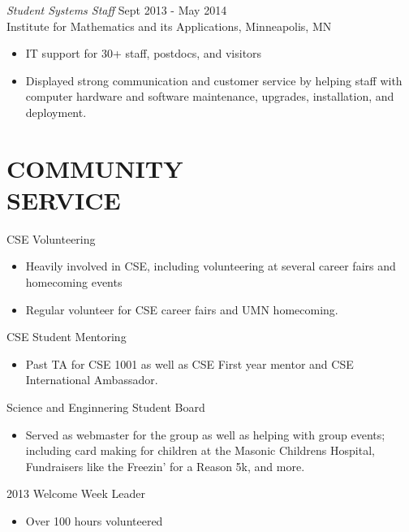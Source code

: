\documentclass[margin]{res}
\begin{document}
\begin{resume}
                {\sl Student Systems Staff} \hfill   Sept 2013 - May 2014 \\
                Institute for Mathematics and its Applications, Minneapolis, MN
                  \begin{itemize}
                   \item IT support for 30+ staff, postdocs, and visitors
                   \item Displayed strong communication and customer service by helping staff with computer hardware and software maintenance, upgrades, installation, and deployment.
                   \end{itemize}

\section{COMMUNITY \\ SERVICE}
                CSE Volunteering
                \begin{itemize}
                  \item Heavily involved in CSE, including volunteering at several career fairs and homecoming events
                  \item Regular volunteer for CSE career fairs and UMN homecoming.
                \end{itemize}

                CSE Student Mentoring
                \begin{itemize}
                  \item Past TA for CSE 1001 as well as CSE First year mentor and CSE International Ambassador.
                \end{itemize}

                Science and Enginnering Student Board
                \begin{itemize}
                  \item Served as webmaster for the group as well as helping with group events; including card making for children at the Masonic Childrens Hospital, Fundraisers like the Freezin' for a Reason 5k, and more.
                \end{itemize}

                2013 Welcome Week Leader
                \begin{itemize}
                  \item Over 100 hours volunteered
                \end{itemize}

\end{resume}
\end{document}

